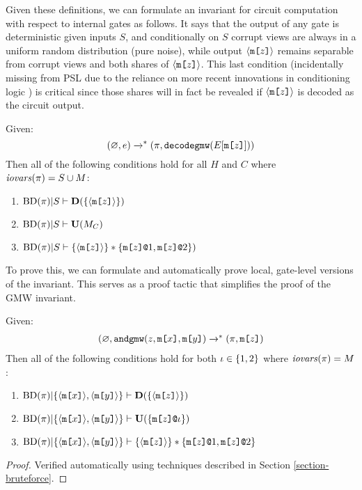 Given these definitions, we can formulate an invariant for circuit
computation with respect to internal gates as follows. It says that
the output of any gate is deterministic given inputs $S$, and
conditionally on $S$ corrupt views are always in a uniform random
distribution (pure noise), while output $\langle \texttt{m[}z\texttt{]} \rangle$ remains
separable from corrupt views and both shares of
$\langle \texttt{m[}z\texttt{]} \rangle$. This last condition (incidentally missing from PSL
due to the reliance on more recent innovations in conditioning logic
\cite{li2023lilac}) is critical since those shares will in fact be
revealed if $\langle \texttt{m[}z\texttt{]} \rangle$ is decoded as the circuit output.
\begin{lemma}
  \label{lemma-gmwinvariant}
  Given:
  $$ (\varnothing,e) \xrightarrow{}^{*} (\pi,\texttt{decodegmw}(E[\texttt{m[}z\texttt{]}])) $$
  Then all of the following conditions hold for all $H$ and $C$ where $\mathit{iovars}(\pi) = S \cup M$:
  \begin{enumerate}
  \item $\mathrm{BD}(\pi)|S \vdash \mathbf{D}(\{\langle \texttt{m[}z\texttt{]} \rangle\})$
  \item $\mathrm{BD}(\pi)|S \vdash \mathbf{U}(M_C)$
  \item $\mathrm{BD}(\pi)|S \vdash \{\langle \texttt{m[}z\texttt{]} \rangle\} * \{ \texttt{m[}z\texttt{]}\texttt{@}1, \texttt{m[}z\texttt{]}\texttt{@}2 \})$
  \end{enumerate}
\end{lemma}
To prove this, we can formulate and automatically prove local,
gate-level versions of the invariant. This serves as a proof tactic
that simplifies the proof of the GMW invariant. 
\begin{lemma}
  \label{lemma-gmwtactic}
  Given:
  $$
  \begin{array}{c}
  (\varnothing,\andgmw(z,\mesg{x},\mesg{y}) \redxs %
  (\prog,\mesg{z})
  \end{array}
  $$
  Then all of the following conditions hold for both $\iota \in \{ 1,2 \}$ where $\mathit{iovars}(\pi) = M$:
  \begin{enumerate}
  \item
    $\mathrm{BD}(\pi)|\{ \langle \texttt{m[}x\texttt{]} \rangle,\langle \texttt{m[}y\texttt{]} \rangle \} \vdash \mathbf{D}(\{ \langle \texttt{m[}z\texttt{]} \rangle \})$
  \item $\mathrm{BD}(\pi)|\{ \langle \texttt{m[}x\texttt{]} \rangle,\langle \texttt{m[}y\texttt{]} \rangle \} \vdash \mathbf{U}(\{ \texttt{m[}z\texttt{]}\texttt{@}\iota \})$
  \item $\mathrm{BD}(\pi)|\{ \langle \texttt{m[}x\texttt{]} \rangle,\langle \texttt{m[}y\texttt{]} \rangle \} \vdash \{ \langle \texttt{m[}z\texttt{]} \rangle \} * \{ \texttt{m[}z\texttt{]}\texttt{@}1,\texttt{m[}z\texttt{]}\texttt{@}2 \}$
  \end{enumerate}
\end{lemma}
\begin{proof}
Verified automatically using techniques described in Section \ref{section-bruteforce}.  
\end{proof}

